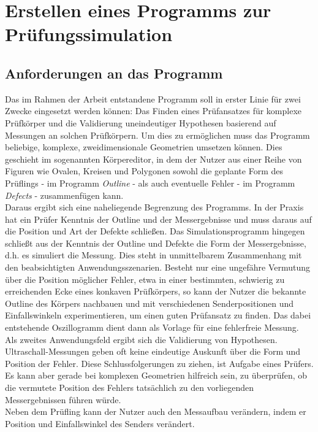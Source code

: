 \documentclass[reducespace,stylepage,semiarbeit]{spezidoc}
\begin{document}
\newpage
\section{Erstellen eines Programms zur Prüfungssimulation }

\subsection{Anforderungen an das Programm}

Das im Rahmen der Arbeit entstandene Programm soll in erster Linie für zwei Zwecke eingesetzt werden können: Das Finden eines Prüfansatzes für komplexe Prüfkörper und die Validierung uneindeutiger Hypothesen basierend auf Messungen an solchen Prüfkörpern.
Um dies zu ermöglichen muss das Programm beliebige, komplexe, zweidimensionale Geometrien umsetzen können. 
Dies geschieht im sogenannten Körpereditor, in dem der Nutzer aus einer Reihe von Figuren wie Ovalen, Kreisen und Polygonen sowohl die geplante Form des Prüflings - im Programm \textit{Outline} - als auch eventuelle Fehler - im Programm \textit{Defects} - zusammenfügen kann. \\
Daraus ergibt sich eine naheliegende Begrenzung des Programms. 
In der Praxis hat ein Prüfer Kenntnis der Outline und der Messergebnisse und muss daraus auf die Position und Art der Defekte schließen. 
Das Simulationsprogramm hingegen schließt aus der Kenntnis der Outline und Defekte die Form der Messergebnisse, d.h. es simuliert die Messung. 
Dies steht in unmittelbarem Zusammenhang mit den beabsichtigten Anwendungsszenarien.
Besteht nur eine ungefähre Vermutung über die Position möglicher Fehler, etwa in einer bestimmten, schwierig zu erreichenden Ecke eines konkaven Prüfkörpers, so kann der Nutzer die bekannte Outline des Körpers nachbauen und mit verschiedenen Senderpositionen und Einfallswinkeln experimentieren, um einen guten Prüfansatz zu finden. 
Das dabei entstehende Oszillogramm dient dann als Vorlage für eine fehlerfreie Messung. \\
Als zweites Anwendungsfeld ergibt sich die Validierung von Hypothesen. 
Ultraschall-Messungen geben oft keine eindeutige Auskunft über die Form und Position der Fehler. 
Diese Schlussfolgerungen zu ziehen, ist Aufgabe eines Prüfers. 
Es kann aber gerade bei komplexen Geometrien hilfreich sein, zu überprüfen, ob die vermutete Position des Fehlers tatsächlich zu den vorliegenden Messergebnissen führen würde. \\
Neben dem Prüfling kann der Nutzer auch den Messaufbau verändern, indem er Position und Einfallswinkel des Senders verändert. 
\end{document}
